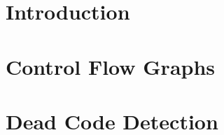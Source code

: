 \documentclass[a4paper, titlepage]{report}
\begin{document}

\chapter{Introduction} 

\chapter{Control Flow Graphs}

\chapter{Dead Code Detection}




\end{document}
